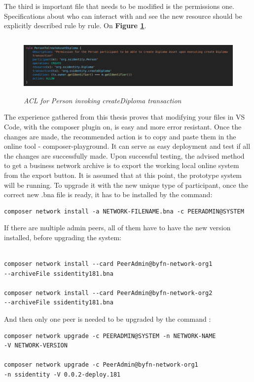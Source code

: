 \documentclass[a4paper,11pt]{report}
\begin{document}
	The third is important file that needs to be modified is the permissions one. Specifications about who can interact with and see the new resource should be explicitly described rule by rule. On \textbf{Figure \ref{personACL}}.
	
\begin{figure}[h]
\centering
  \includegraphics[height = 3cm ,width = 16cm]{personACL.png}
  \caption{\textit{ACL for Person invoking createDiploma transaction}}
  \label{personACL}
\end{figure}

	The experience gathered from this thesis proves that modifying your files in VS Code, with the composer plugin on, is easy and more error resistant. Once the changes are made, the recommended action is to copy and paste them in the online tool - composer-playground. It can serve as easy deployment and test if all the changes are successfully made. 
	Upon successful testing, the advised method to get a business network archive is to export the working local online system from the export button.
	It is assumed that at this point, the prototype system will be running. To upgrade it with the new unique type of participant, once the correct new .bna file is ready, it has to be installed by the command:
\begin{verbatim}
composer network install -a NETWORK-FILENAME.bna -c PEERADMIN@SYSTEM
\end{verbatim}

If there are multiple admin peers, all of them have to have the new version installed, before upgrading the system:
\begin{verbatim}

composer network install --card PeerAdmin@byfn-network-org1 
--archiveFile ssidentity181.bna

composer network install --card PeerAdmin@byfn-network-org2 
--archiveFile ssidentity181.bna
\end{verbatim}
	

And then only one peer is needed to be upgraded by the command : 
\begin{verbatim}
composer network upgrade -c PEERADMIN@SYSTEM -n NETWORK-NAME 
-V NETWORK-VERSION

composer network upgrade -c PeerAdmin@byfn-network-org1 
-n ssidentity -V 0.0.2-deploy.181
\end{verbatim}
\end{document}
